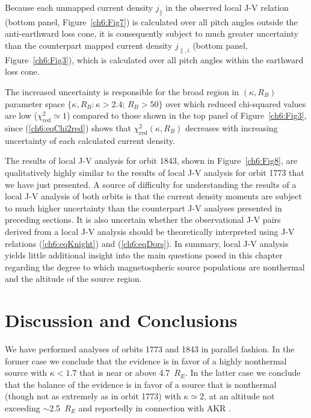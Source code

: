  Because each unmapped current density $j_\parallel$ in the observed local J-V
  relation (bottom panel, Figure~\ref{ch6:Fig7}) is calculated over all pitch
  angles outside the anti-earthward loss cone, it is consequently subject to
  much greater uncertainty than the counterpart mapped current density
  $j_{\parallel,i}$ (bottom panel, Figure~\ref{ch6:Fig3}), which is calculated
  over all pitch angles within the earthward loss cone.
  
  The increased uncertainty is responsible for the broad region in
  $(\kappa, R_B)$ parameter space $\{ \kappa, R_B : \kappa > 2.4$; $R_B > 50 \}$
  over which reduced chi-squared values are low
  ($\chi_{\mathrm{red}}^2 \simeq 1$) compared to those shown in the top panel of
  Figure~\ref{ch6:Fig3}, since (\ref{ch6:eqChi2red}) shows that
  $\chi^2_{\mathrm{red}} (\kappa, R_B)$ decreases with increasing uncertainty of
  each calculated current density.

  The results of local J-V analysis for orbit 1843, shown in
  Figure~\ref{ch6:Fig8}, are qualitatively highly similar to the results of
  local J-V analysis for orbit 1773 that we have just presented. A source of
  difficulty for understanding the results of a local J-V analysis of both
  orbits is that the current density moments are subject to much higher
  uncertainty than the counterpart J-V analyses presented in preceding
  sections. It is also uncertain whether the observational J-V pairs derived
  from a local J-V analysis should be theoretically interpreted using J-V
  relations (\ref{ch6:eqKnight}) and (\ref{ch6:eqDors}). In summary, local J-V
  analysis yields little additional insight into the main questions posed in
  this chapter regarding the degree to which magnetospheric source populations
  are nonthermal and the altitude of the source region.

  \section{Discussion and Conclusions}

  We have performed analyses of orbits 1773 and 1843 in parallel fashion. In the
  former case we conclude that the evidence is in favor of a highly nonthermal
  source with $\kappa < 1.7$ that is near or above 4.7~$R_E$. In the latter case
  we conclude that the balance of the evidence is in favor of a source that is
  nonthermal (though not as extremely as in orbit 1773) with $\kappa \simeq 2$,
  at an altitude not exceeding $\sim$2.5~$R_E$ and reportedly in connection with
  AKR \citep{Ergun1998}.

